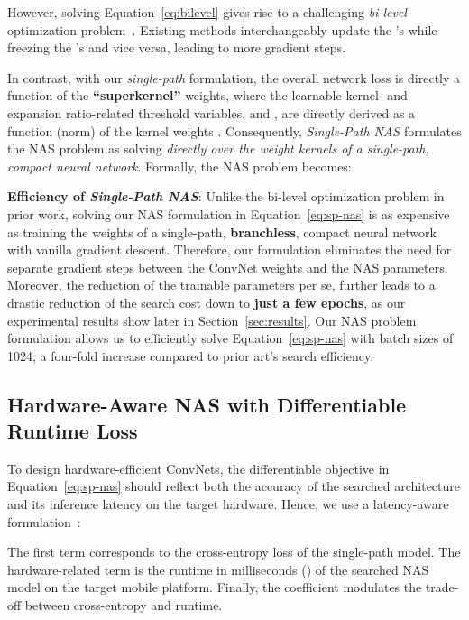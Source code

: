\documentclass[runningheads]{llncs}
\begin{document}
However, solving Equation~\ref{eq:bilevel} gives rise to a challenging \textit{bi-level} 
optimization problem~\cite{liu2018darts}. Existing methods interchangeably 
update the 's while freezing the 's and vice versa, leading to more gradient steps. 


In contrast, with our \textit{single-path} formulation, the overall network loss
is directly a function of the \textbf{``superkernel''} weights, where the learnable
kernel- and expansion ratio-related threshold variables, 
and , are directly derived as a function (norm) of
the kernel weights . Consequently, \textit{Single-Path NAS} formulates 
the NAS problem as solving \textit{directly over the weight kernels  
of a single-path, compact neural network}. Formally, the NAS problem becomes:


\textbf{Efficiency of \textit{Single-Path NAS}}: 
Unlike the bi-level optimization problem in prior work, solving
our NAS formulation in Equation~\ref{eq:sp-nas} is as expensive as
training the weights of a single-path, \textbf{branchless}, compact neural network
with vanilla gradient descent. Therefore, our formulation eliminates the need 
for separate gradient steps between the ConvNet
weights and the NAS parameters. Moreover, the reduction of the trainable 
parameters  per se, further leads to a drastic reduction of
the search cost down to \textbf{just a few epochs},
as our experimental results show later in Section~\ref{sec:results}.
Our NAS problem formulation allows us to efficiently 
solve Equation~\ref{eq:sp-nas} with batch sizes of 1024, 
a four-fold increase compared to prior art's search efficiency.


\subsection{Hardware-Aware NAS with Differentiable Runtime Loss}
\label{subsec:hw-loss}

To design hardware-efficient ConvNets, the differentiable objective in Equation~\ref{eq:sp-nas}
should reflect both the accuracy of the searched architecture and its inference latency
on the target hardware. Hence, we use a latency-aware 
formulation~\cite{cai2018proxylessnas,wu2018fbnet}:

The first term  corresponds to the cross-entropy loss of the
single-path model. The hardware-related term  is the 
runtime in milliseconds () of the searched NAS model on the target 
mobile platform. Finally, the coefficient  modulates
the trade-off between cross-entropy and runtime.
\end{document}
